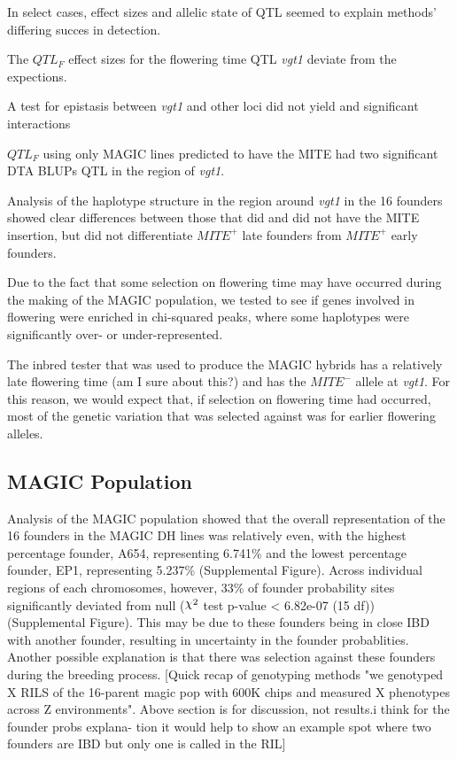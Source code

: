 \documentclass[article,9pt,twocolumn,twoside]{rilabRxiv}
\DeclareRobustCommand{\rchi}{{\mathpalette\irchi\relax}}
\newcommand{\irchi}[2]{\raisebox{\depth}{$#1\chi$}} %
\begin{document}
In select cases, effect sizes and allelic state of QTL seemed to explain methods' differing succes in detection.

The $QTL_F$ effect sizes for the flowering time QTL \emph{vgt1} deviate from the expections.

A test for epistasis between \emph{vgt1} and other loci did not yield and significant interactions

$QTL_F$ using only MAGIC lines predicted to have the MITE had two significant DTA BLUPs QTL in the region of \emph{vgt1}.

Analysis of the haplotype structure in the region around \emph{vgt1} in the 16 founders showed clear differences between those that did and did not have the MITE insertion, but did not differentiate $MITE^+$ late founders from $MITE^+$ early founders.


Due to the fact that some selection on flowering time may have occurred during the making of the MAGIC population, we tested to see if genes involved in flowering were enriched in chi-squared peaks, where some haplotypes were significantly over- or under-represented.

The inbred tester that was used to produce the MAGIC hybrids has a relatively late flowering time (am I sure about this?) and has the $MITE^-$ allele at \emph{vgt1}. For this reason, we would expect that, if selection on flowering time had occurred, most of the genetic variation that was selected against was for earlier flowering alleles.

\subsection{MAGIC Population}
Analysis of the MAGIC population showed that the overall representation of the 16 founders in the MAGIC DH lines was relatively even, with the highest percentage founder, A654, representing 6.741\% and the lowest percentage founder, EP1, representing 5.237\% (Supplemental Figure). Across individual regions of each chromosomes, however, 33\% of founder probability sites significantly deviated from null ($\rchi^2$ test p-value < 6.82e-07 (15 df)) (Supplemental Figure).
This may be due to these founders being in close IBD with another founder, resulting in uncertainty in the founder probablities. Another possible explanation is that there was selection against these founders during the breeding process.
[Quick recap of genotyping methods "we genotyped X RILS of the 16-parent magic pop with 600K chips and measured X phenotypes across Z environments". Above section is for discussion, not results.i think for the founder probs explana- tion it would help to show an example spot where two founders are IBD but only one is called in the RIL]
\end{document}

